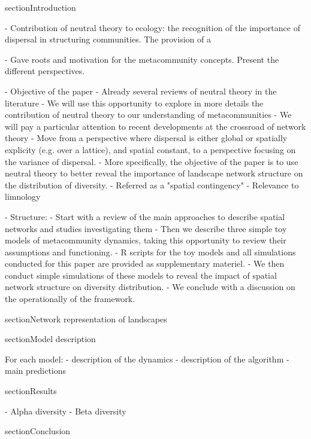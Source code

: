 



section{Introduction}

- Contribution of neutral theory to ecology: the recognition of the importance of dispersal in structuring communities. The provision of a  


- Gave roots and motivation for the metacommunity concepts. Present the different perspectives.


- Objective of the paper 
	- Already several reviews of neutral theory in the literature
	- We will use this opportunity to explore in more details the contribution of neutral theory to our understanding of metacommunities
	- We will pay a particular attention to recent developments at the crossroad of network theory
	- Move from a perspective where dispersal is either global or spatially explicity (e.g. over a lattice), and spatial constant, to a perspective focusing on the variance of dispersal. 
	- More specifically, the objective of the paper is to use neutral theory to better reveal the importance of landscape network structure on the distribution of diversity.
	- Referred as a "spatial contingency" 
	- Relevance to limnology

- Structure:
	- Start with a review of the main approaches to describe spatial networks and studies investigating them
	- Then we describe three simple toy models of metacommunity dynamics, taking this opportunity to review their assumptions and functioning.
	- R scripts for the toy models and all simulations conducted for this paper are provided as supplementary materiel.
	- We then conduct simple simulations of these models to reveal the impact of spatial network structure on diversity distribution. 
	- We conclude with a discussion on the operationally of the framework.



section{Network representation of landscapes}



 

section{Model description}


For each model:
	- description of the dynamics
	- description of the algorithm
	- main predictions


section{Results}

- Alpha diversity
- Beta diversity 




section{Conclusion}

